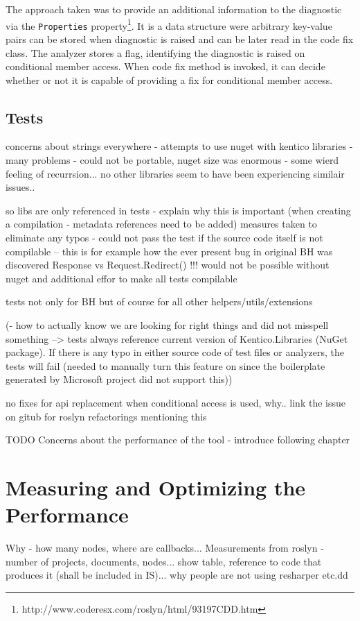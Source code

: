 \documentclass[
  digital, %
  table,   %
  lof,     %
  lot,     %
  oneside,
]{fithesis3}
\begin{document}
The approach taken was to provide an additional information to the diagnostic via the \texttt{Properties} property\footnote{http://www.coderesx.com/roslyn/html/93197CDD.htm}. It is a data structure were arbitrary key-value pairs can be stored when diagnostic is raised and can be later read in the code fix class. The analyzer stores a flag, identifying the diagnostic is raised on conditional member access. When code fix method is invoked, it can decide whether or not it is capable of providing a fix for conditional member access.

\section{Tests}
concerns about strings everywhere - attempts to use nuget with kentico libraries - many problems - could not be portable, nuget size was enormous - some wierd feeling of recurrsion... no other libraries seem to have been experiencing similair issues..

so libs are only referenced in tests - explain why this is important (when creating a compilation - metadata references need to be added)
measures taken to eliminate any typos - could not pass the test if the source code itself is not compilable -- this is for example how the ever present bug in original BH was discovered Response vs Request.Redirect() !!! would not be possible without nuget and additional effor to make all tests compilable

tests not only for BH but of course for all other helpers/utils/extensions

(- how to actually know we are looking for right things and did not misspell something --> tests always reference current version of Kentico.Libraries (NuGet package). If there is any typo in either source code of test files or analyzers, the tests will fail (needed to manually turn this feature on since the boilerplate generated by Microsoft project did not support this))

no fixes for api replacement when conditional access is used, why.. link the issue on gitub for roslyn refactorings mentioning this


TODO
Concerns about the performance of the tool - introduce following chapter

\chapter{Measuring and Optimizing the Performance}
Why - how many nodes, where are callbacks...
Measurements from roslyn - number of projects, documents, nodes... show table, reference to code that produces it (shall be included in IS)... why people are not using resharper etc.dd
\end{document}
